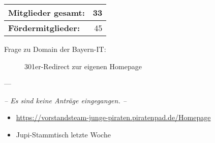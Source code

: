 \begin{Protokoll}
	\begin{center}
		\begin{tabular}{|l||r|}
			\hline
			\textbf{Mitglieder gesamt:} & 33 \\
			\hline
			\textbf{Fördermitglieder:} & 45 \\                
			\hline
			\hline
		\end{tabular}
	\end{center}
	    
	    
	\begin{description}
		\item[Frage zu Domain der Bayern-IT:] 301er-Redirect zur eigenen Homepage
	\end{description}
	    
	---
	    
	\emph{-- Es sind keine Anträge eingegangen. --}
	    
	\begin{itemize}
		\item \url{https://vorstandsteam-junge-piraten.piratenpad.de/Homepage}
		\item Jupi-Stammtisch letzte Woche
	\end{itemize}
	    
	  
	  
	    
	    
\end{Protokoll}


